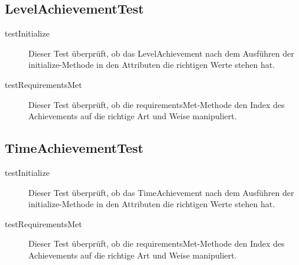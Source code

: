 \subsection{LevelAchievementTest}

\begin{description}
\item[testInitialize]
Dieser Test überprüft, ob das LevelAchievement nach dem Ausführen der initialize-Methode in den Attributen die richtigen Werte stehen hat.

\item[testRequirementsMet]
Dieser Test überprüft, ob die requirementsMet-Methode den Index des Achievements auf die richtige Art und Weise manipuliert.

\end{description}


\subsection{TimeAchievementTest}

\begin{description}
\item[testInitialize]
Dieser Test überprüft, ob das TimeAchievement nach dem Ausführen der initialize-Methode in den Attributen die richtigen Werte stehen hat.

\item[testRequirementsMet]
Dieser Test überprüft, ob die requirementsMet-Methode den Index des Achievements auf die richtige Art und Weise manipuliert.

\end{description}

